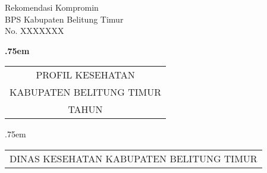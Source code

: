 \begin{titlepage}
    \begin{center}
        {\raggedleft Rekomendasi Kompromin\\BPS Kabupaten Belitung Timur\\No. XXXXXXX
        
        }
        \vspace*{48ex}
            
        {\LARGE \bfseries
        	\lineskip .75em%
        	\begin{tabular}[t]{c}%
        		PROFIL KESEHATAN\\KABUPATEN BELITUNG TIMUR\\TAHUN \tPnos{}
        	\end{tabular}\par}%
            
            
        \vspace{3ex}
        {\large
        	\lineskip .75em%
        	\begin{tabular}[t]{c}%
        		DINAS KESEHATAN KABUPATEN BELITUNG TIMUR
        	\end{tabular}\par}%
            
            
        \vspace{1.5ex}
    \end{center}
\end{titlepage}